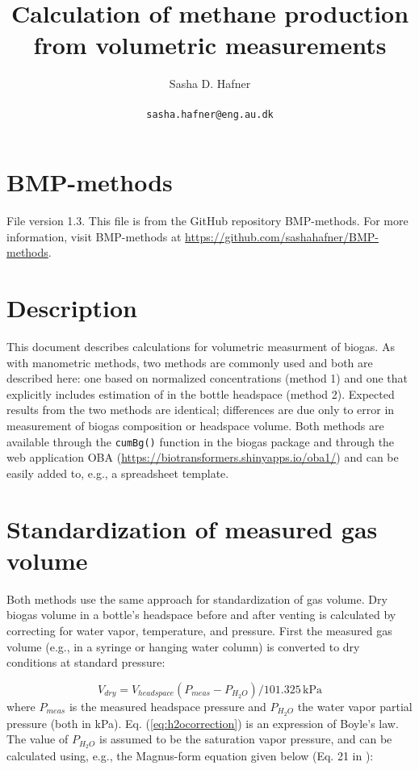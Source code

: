 \documentclass[]{article}
\title {Calculation of methane production from volumetric measurements}
\author{Sasha D. Hafner\\
\\
\texttt{sasha.hafner@eng.au.dk}
}
\newcommand{\unit}[1]{\ensuremath{\, \mathrm{#1}}}
\begin{document}
\maketitle

\section{BMP-methods}
File version 1.3. 
This file is from the GitHub repository BMP-methods.
For more information, visit BMP-methods at \url{https://github.com/sashahafner/BMP-methods}.

\section{Description}
This document describes calculations for volumetric measurment of biogas.
As with manometric methods, two methods are commonly used and both are described here: one based on normalized  concentrations (method 1) and one that explicitly includes estimation of  in the bottle headspace (method 2).
Expected results from the two methods are identical; differences are due only to error in measurement of biogas composition or headspace volume.
Both methods are available through the \texttt{cumBg()} function in the biogas package \cite{softwarex} and through the web application OBA (\url{https://biotransformers.shinyapps.io/oba1/}) and can be easily added to, e.g., a spreadsheet template.

\section{Standardization of measured gas volume}
Both methods use the same approach for standardization of gas volume.
Dry biogas volume in a bottle's headspace before and after venting is calculated by correcting for water vapor, temperature, and pressure.
First the measured gas volume (e.g., in a syringe or hanging water column) is converted to dry conditions at standard pressure:

\begin{equation}
  \label{eq:h2ocorrection}
  V_{dry} = V_{headspace}(P_{meas} - P_{H_2O})/101.325 \unit{kPa}
\end{equation}
where $P_{meas}$ is the measured headspace pressure and $P_{H_2O}$ the water vapor partial pressure (both in kPa).
Eq. (\ref{eq:h2ocorrection}) is an expression of Boyle's law.
The value of $P_{H_2O}$ is assumed to be the saturation vapor pressure, and can be calculated using, e.g., the Magnus-form equation given below (Eq. 21 in \cite{magnus}):
\end{document}
